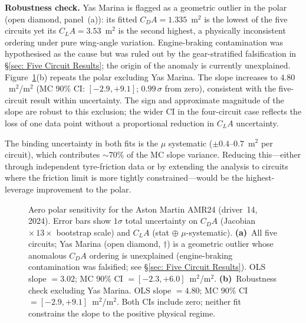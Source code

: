 \textbf{Robustness check.} Yas Marina is flagged as a geometric outlier in the polar (open diamond, panel~(a)): its fitted $C_DA = 1.335$~m$^2$ is the lowest of the five circuits yet its $C_LA = 3.53$~m$^2$ is the second highest, a physically inconsistent ordering under pure wing-angle variation. Engine-braking contamination was hypothesised as the cause but was ruled out by the gear-stratified falsification in \S\ref{sec: Five Circuit Results}; the origin of the anomaly is currently unexplained. Figure~\ref{fig: aero polar}(b) repeats the polar excluding Yas Marina. The slope increases to $4.80$~m$^2$/m$^2$ (MC 90\% CI: $[-2.9, +9.1]$; $0.99\,\sigma$ from zero), consistent with the five-circuit result within uncertainty. The sign and approximate magnitude of the slope are robust to this exclusion; the wider CI in the four-circuit case reflects the loss of one data point without a proportional reduction in $C_LA$ uncertainty.

The binding uncertainty in both fits is the $\mu$ systematic ($\pm 0.4$--$0.7$~m$^2$ per circuit), which contributes $\sim\!70\%$ of the MC slope variance. Reducing this---either through independent tyre-friction data or by extending the analysis to circuits where the friction limit is more tightly constrained---would be the highest-leverage improvement to the polar.

\begin{figure}[h]
    \centering
    
    \caption[Aero polar sensitivity for Aston Martin AMR24 (driver 14, 2024). Left: all five circuits with Yas Marina flagged anomalous (open diamond). Right: four-circuit robustness check excluding Yas Marina. Error bars show $1\sigma$ total uncertainty on $C_DA$ (bootstrap-scaled) and $C_LA$ (statistical $\oplus$ $\mu$-systematic).]{Aero polar sensitivity for the Aston Martin AMR24 (driver~14, 2024). Error bars show $1\sigma$ total uncertainty on $C_DA$ (Jacobian $\times\,13\times$ bootstrap scale) and $C_LA$ (stat $\oplus$ $\mu$-systematic). \textbf{(a)}~All five circuits; Yas Marina (open diamond, $\dagger$) is a geometric outlier whose anomalous $C_DA$ ordering is unexplained (engine-braking contamination was falsified; see \S\ref{sec: Five Circuit Results}). OLS slope $= 3.02$; MC 90\% CI $= [-2.3, +6.0]$~m$^2$/m$^2$. \textbf{(b)}~Robustness check excluding Yas Marina. OLS slope $= 4.80$; MC 90\% CI $= [-2.9, +9.1]$~m$^2$/m$^2$. Both CIs include zero; neither fit constrains the slope to the positive physical regime.}
    \label{fig: aero polar}
\end{figure}

